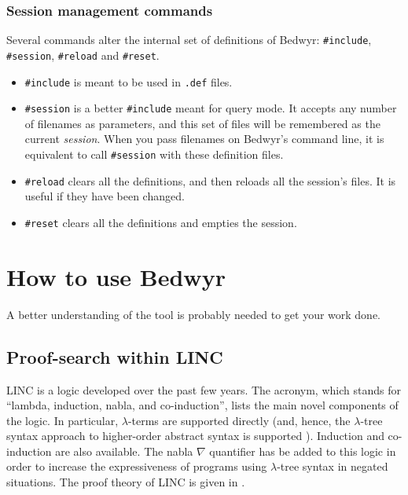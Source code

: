 \documentclass{article}
\begin{document}
\subsubsection{Session management commands}

Several commands alter the internal set of definitions of Bedwyr:
\verb.#include., \verb.#session., \verb.#reload. and \verb.#reset..
\begin{itemize}
  \item
    \verb.#include. is meant to be used in \verb;.def; files.
  \item
    \verb.#session. is a better \verb.#include. meant for query mode.
    It accepts any number of filenames as parameters, and this set of files
    will be remembered as the current \emph{session}.
    When you pass filenames on Bedwyr's command line,
    it is equivalent to call \verb.#session. with these definition files.
  \item
    \verb.#reload. clears all the definitions,
    and then reloads all the session's files. It is useful if they have 
    been changed.
  \item
    \verb.#reset. clears all the definitions and empties the session.
\end{itemize}

\section{How to use Bedwyr}
\label{sec:howto}

A better understanding of the tool is probably needed to get your work
done. 

\subsection{Proof-search within LINC}
\label{psearch}

LINC is a logic developed over the past few years.  The acronym, which
stands for ``lambda, induction, nabla, and co-induction'', lists the
main novel components of the logic.  In particular, $\lambda$-terms
are supported directly (and, hence, the $\lambda$-tree syntax approach
to higher-order abstract syntax is supported \cite{miller00cl}).
Induction and co-induction are also available.  The nabla $\nabla$
quantifier has be added to this logic in order to increase the
expressiveness of programs using $\lambda$-tree syntax in negated situations.  The
proof theory of LINC is given in \cite{miller05tocl,tiu04phd}.
\end{document}
